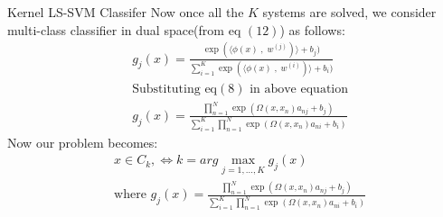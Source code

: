 \documentclass{beamer}
\begin{document}
\begin{frame}{Kernel LS-SVM Classifer}
    Now once all the $K$ systems are solved, we consider multi-class classifier in dual space(from eq $(12)$) as follows:
    \begin{align*}
        &g_{j}(x) = \frac{\exp(\langle \phi(x)\;,\; w^{(j)})\rangle + b_{j})}{\sum_{i=1}^{K} \exp(\langle \phi(x)\;,\; w^{(i)})\rangle + b_{i})}\\
        &\text{Substituting eq$(8)$ in above equation} \\
        &g_{j}(x) = \frac{\prod_{n=1}^{N}\exp(\Omega(x,x_{n})a_{nj} + b_{j})}{\sum_{i=1}^{K} \prod_{n=1}^{N}\exp(\Omega(x,x_{n})a_{ni} + b_{i})}
    \end{align*}
    Now our problem becomes:
    \begin{align*}
        & x \in C_{k}, \Leftrightarrow k= arg \max_{j=1,\ldots,K} g_{j}(x)\\
        & \text{where } g_{j}(x) = \frac{\prod_{n=1}^{N}\exp(\Omega(x,x_{n})a_{nj} + b_{j})}{\sum_{i=1}^{K} \prod_{n=1}^{N}\exp(\Omega(x,x_{n})a_{ni} + b_{i})}
    \end{align*}

\end{frame}
\end{document}
